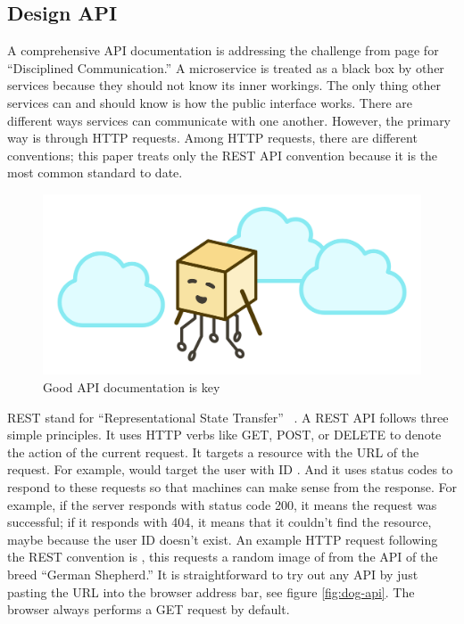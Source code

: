 \subsection{Design API}

A comprehensive API documentation is addressing the challenge from page \pageref{sec:theory:challenges:communication} for ``Disciplined Communication.'' A microservice is treated as a black box by other services because they should not know its inner workings. The only thing other services can and should know is how the public interface works. There are different ways services can communicate with one another. However, the primary way is through HTTP requests. Among HTTP requests, there are different conventions; this paper treats only the REST API convention because it is the most common standard to date.

\begin{figure}[ht]
  \centering
  \includegraphics[width=0.55\linewidth]{assets/illustration-microservice-api.png}
  \caption{Good API documentation is key}
\end{figure}

REST stand for ``Representational State Transfer'' ~\cite{rest.2020}. A REST API follows three simple principles. It uses HTTP verbs like GET, POST, or DELETE to denote the action of the current request. It targets a resource with the URL of the request. For example,  would target the user with ID . And it uses status codes to respond to these requests so that machines can make sense from the response. For example, if the server responds with status code 200, it means the request was successful; if it responds with 404, it means that it couldn't find the resource, maybe because the user ID doesn't exist. An example HTTP request following the REST convention is , this requests a random image of from the  API of the breed ``German Shepherd.'' It is straightforward to try out any API by just pasting the URL into the browser address bar, see figure \ref{fig:dog-api}. The browser always performs a GET request by default.


